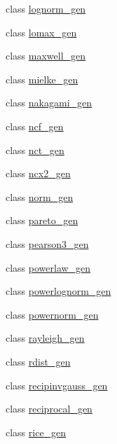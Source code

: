 \begin{DoxyCompactItemize}
class \hyperlink{classscipy_1_1stats_1_1__continuous__distns_1_1lognorm__gen}{lognorm\+\_\+gen}
\item 
class \hyperlink{classscipy_1_1stats_1_1__continuous__distns_1_1lomax__gen}{lomax\+\_\+gen}
\item 
class \hyperlink{classscipy_1_1stats_1_1__continuous__distns_1_1maxwell__gen}{maxwell\+\_\+gen}
\item 
class \hyperlink{classscipy_1_1stats_1_1__continuous__distns_1_1mielke__gen}{mielke\+\_\+gen}
\item 
class \hyperlink{classscipy_1_1stats_1_1__continuous__distns_1_1nakagami__gen}{nakagami\+\_\+gen}
\item 
class \hyperlink{classscipy_1_1stats_1_1__continuous__distns_1_1ncf__gen}{ncf\+\_\+gen}
\item 
class \hyperlink{classscipy_1_1stats_1_1__continuous__distns_1_1nct__gen}{nct\+\_\+gen}
\item 
class \hyperlink{classscipy_1_1stats_1_1__continuous__distns_1_1ncx2__gen}{ncx2\+\_\+gen}
\item 
class \hyperlink{classscipy_1_1stats_1_1__continuous__distns_1_1norm__gen}{norm\+\_\+gen}
\item 
class \hyperlink{classscipy_1_1stats_1_1__continuous__distns_1_1pareto__gen}{pareto\+\_\+gen}
\item 
class \hyperlink{classscipy_1_1stats_1_1__continuous__distns_1_1pearson3__gen}{pearson3\+\_\+gen}
\item 
class \hyperlink{classscipy_1_1stats_1_1__continuous__distns_1_1powerlaw__gen}{powerlaw\+\_\+gen}
\item 
class \hyperlink{classscipy_1_1stats_1_1__continuous__distns_1_1powerlognorm__gen}{powerlognorm\+\_\+gen}
\item 
class \hyperlink{classscipy_1_1stats_1_1__continuous__distns_1_1powernorm__gen}{powernorm\+\_\+gen}
\item 
class \hyperlink{classscipy_1_1stats_1_1__continuous__distns_1_1rayleigh__gen}{rayleigh\+\_\+gen}
\item 
class \hyperlink{classscipy_1_1stats_1_1__continuous__distns_1_1rdist__gen}{rdist\+\_\+gen}
\item 
class \hyperlink{classscipy_1_1stats_1_1__continuous__distns_1_1recipinvgauss__gen}{recipinvgauss\+\_\+gen}
\item 
class \hyperlink{classscipy_1_1stats_1_1__continuous__distns_1_1reciprocal__gen}{reciprocal\+\_\+gen}
\item 
class \hyperlink{classscipy_1_1stats_1_1__continuous__distns_1_1rice__gen}{rice\+\_\+gen}

\end{DoxyCompactItemize}
